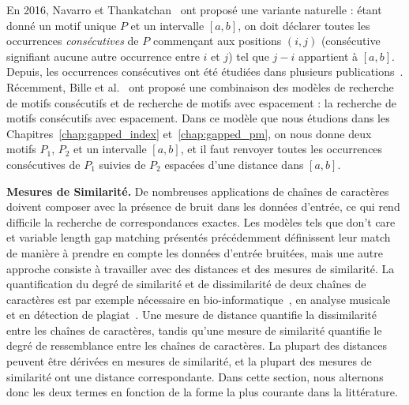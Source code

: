 En 2016, Navarro et Thankatchan~\cite{NAVARRO2016108} ont proposé une variante naturelle : étant donné un motif unique $P$ et un intervalle $[a,b]$, on doit déclarer toutes les occurrences \emph{consécutives} de $P$ commençant aux positions $(i,j)$ (consécutive signifiant aucune autre occurrence entre $i$ et $j$) tel que $j-i$ appartient à $[a,b]$. Depuis, les occurrences consécutives ont été étudiées dans plusieurs publications~\cite{DBLP:conf/fsttcs/BilleGPRS20,DBLP:journals/corr/abs-2304-00887,DBLP:journals/corr/abs-2211-16860}.
Récemment, Bille et al.~\cite{bille2022gapped} ont proposé une combinaison des modèles de recherche de motifs consécutifs et de recherche de motifs avec espacement : la recherche de motifs consécutifs avec espacement.
Dans ce modèle que nous étudions dans les Chapitres~\ref*{chap:gapped_index} et~\ref*{chap:gapped_pm}, on nous donne deux motifs $P_1$, $P_2$ et un intervalle $[a, b]$, et il faut renvoyer toutes les occurrences consécutives de $P_1$ suivies de $P_2$ espacées d'une distance dans $[a, b]$. 



\noindent\textbf{Mesures de Similarité.} 
De nombreuses applications de chaînes de caractères doivent composer avec la présence de bruit dans les données d'entrée, ce qui rend difficile la recherche de correspondances exactes. Les modèles tels que \og{}don't care\fg{} et \og{}variable length gap matching\fg{} présentés précédemment définissent leur match de manière à prendre en compte les données d'entrée bruitées, mais une autre approche consiste à travailler avec des distances et des mesures de similarité. La quantification du degré de similarité et de dissimilarité de deux chaînes de caractères est par exemple nécessaire en bio-informatique~\cite{Gusfield1997}, en analyse musicale~\cite{Mongeau1990} et en détection de plagiat~\cite{lukashenko2007computer}. 
%
Une mesure de distance quantifie la dissimilarité entre les chaînes de caractères, tandis qu'une mesure de similarité quantifie le degré de ressemblance entre les chaînes de caractères. La plupart des distances peuvent être dérivées en mesures de similarité, et la plupart des mesures de similarité ont une distance correspondante. Dans cette section, nous alternons donc les deux termes en fonction de la forme la plus courante dans la littérature.

